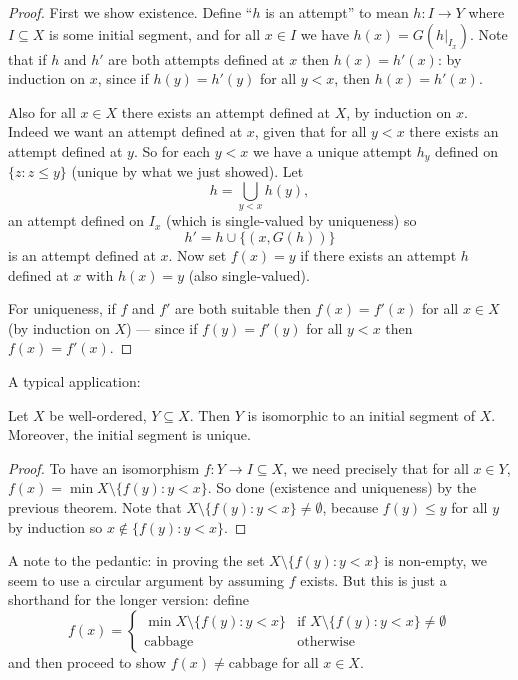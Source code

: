 \documentclass[a4paper]{article}
\begin{document}
\begin{proof}
  First we show existence. Define ``\(h\) is an attempt'' to mean \(h: I \to Y\) where \(I \subseteq X\) is some initial segment, and for all \(x \in I\) we have \(h(x) = G(h|_{I_x})\). Note that if \(h\) and \(h'\) are both attempts defined at \(x\) then \(h(x) = h'(x)\): by induction on \(x\), since if \(h(y) = h'(y)\) for all \(y < x\), then \(h(x) = h'(x)\).

  Also for all \(x \in X\) there exists an attempt defined at \(X\), by induction on \(x\). Indeed we want an attempt defined at \(x\), given that for all \(y < x\) there exists an attempt defined at \(y\). So for each \(y < x\) we have a unique attempt \(h_y\) defined on \(\{z: z\leq y\}\) (unique by what we just showed). Let
  \[
    h = \bigcup_{y < x} h(y),
  \]
  an attempt defined on \(I_x\) (which is single-valued by uniqueness) so
  \[
    h' = h \cup \{(x, G(h))\}
  \]
  is an attempt defined at \(x\). Now set \(f(x) = y\) if there exists an attempt \(h\) defined at \(x\) with \(h(x) = y\) (also single-valued).

  For uniqueness, if \(f\) and \(f'\) are both suitable then \(f(x) = f'(x)\) for all \(x \in X\) (by induction on \(X\)) --- since if \(f(y) = f'(y)\) for all \(y < x\) then \(f(x) = f'(x)\).
\end{proof}

A typical application:

\begin{proposition}
  Let \(X\) be well-ordered, \(Y \subseteq X\). Then \(Y\) is isomorphic to an initial segment of \(X\). Moreover, the initial segment is unique.
\end{proposition}

\begin{proof}
  To have an isomorphism \(f: Y \to I \subseteq X\), we need precisely that for all \(x \in Y\), \(f(x) = \min X \setminus \{f(y): y < x\}\). So done (existence and uniqueness) by the previous theorem. Note that \(X \setminus \{f(y): y < x\} \neq \emptyset\), because \(f(y) \leq y\) for all \(y\) by induction so \(x \notin \{f(y): y < x\}\).
\end{proof}

A note to the pedantic: in proving the set \(X \setminus \{f(y): y < x\}\) is non-empty, we seem to use a circular argument by assuming \(f\) exists. But this is just a shorthand for the longer version: define
\[
  f(x) =
  \begin{cases}
    \min X \setminus \{f(y): y < x\} & \text{if } X \setminus \{f(y): y < x\} \neq \emptyset \\
    \text{cabbage} & \text{otherwise}
  \end{cases}
\]
and then proceed to show \(f(x) \neq \text{cabbage}\) for all \(x \in X\).
\end{document}
